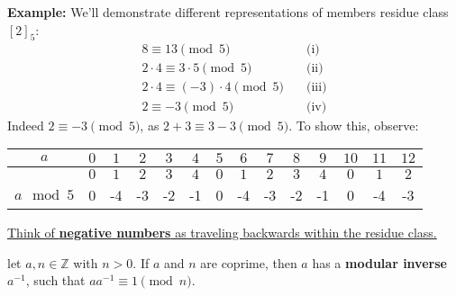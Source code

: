 \noindent
\textbf{Example:} We'll demonstrate different representations of members residue class $[2]_5$:
\begin{align*}
    8 \equiv 13 \pmod{5} & \quad \text{(i)} \\
    2\cdot4 \equiv 3\cdot5 \pmod{5} & \quad \text{(ii)} \\
    2\cdot4 \equiv (-3)\cdot4 \pmod{5} & \quad \text{(iii)} \\ 
    2 \equiv -3 \pmod{5} & \quad \text{(iv)}
\end{align*}
Indeed $2\equiv-3\pmod{5}$, as $2+3\equiv3-3\pmod{5}$. To show this, observe:

\begin{table}[h!]
    \setlength{\tabcolsep}{10pt} %
    \renewcommand{\arraystretch}{1.2} %
    \centering
\begin{tabular}{|*{14}{c|}}
    
    
    \hline
   \rowcolor{OliveGreen!10}\cellcolor{white}$a$ & $0$ & $1$ & $2$ & $3$ & $4$ & $5$ & $6$ & $7$ & $8$ & $9$ & $10$ & $11$ & $12$ \\
    \hline
       & $0$ & $1$ & $2$ & $3$ & $4$ & $0$ & $1$ & $2$ & $3$ & $4$ & $0$ & $1$ & $2$ \\
    \cline{2-14}
    \multirow{-2}{*}{$a\mod 5$}&0&-4&-3&-2&-1&0&-4&-3&-2&-1&0&-4&-3\\
    \hline
\end{tabular}
\end{table}
\noindent
\underline{Think of \textbf{negative numbers} as traveling backwards within the residue class.}

\begin{Def}
    let $a,n\in\mathbb{Z}$ with $n>0$. If $a$ and $n$ are coprime, then $a$ has a \textbf{modular inverse} $a^{-1}$, such that $aa^{-1}\equiv1\pmod{n}$.
\end{Def}





